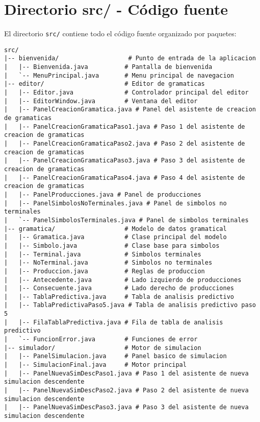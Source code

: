 \section{Directorio src/ - Código fuente}

El directorio \texttt{src/} contiene todo el código fuente organizado por paquetes:

\begin{lstlisting}[caption=Estructura del código fuente]
src/
|-- bienvenida/                   # Punto de entrada de la aplicacion
|   |-- Bienvenida.java          # Pantalla de bienvenida
|   `-- MenuPrincipal.java       # Menu principal de navegacion
|-- editor/                      # Editor de gramaticas
|   |-- Editor.java              # Controlador principal del editor
|   |-- EditorWindow.java        # Ventana del editor
|   |-- PanelCreacionGramatica.java # Panel del asistente de creacion de gramaticas
|   |-- PanelCreacionGramaticaPaso1.java # Paso 1 del asistente de creacion de gramaticas
|   |-- PanelCreacionGramaticaPaso2.java # Paso 2 del asistente de creacion de gramaticas
|   |-- PanelCreacionGramaticaPaso3.java # Paso 3 del asistente de creacion de gramaticas
|   |-- PanelCreacionGramaticaPaso4.java # Paso 4 del asistente de creacion de gramaticas
|   |-- PanelProducciones.java # Panel de producciones
|   |-- PanelSimbolosNoTerminales.java # Panel de simbolos no terminales
|   `-- PanelSimbolosTerminales.java # Panel de simbolos terminales
|-- gramatica/                   # Modelo de datos gramatical
|   |-- Gramatica.java           # Clase principal del modelo
|   |-- Simbolo.java             # Clase base para simbolos
|   |-- Terminal.java            # Simbolos terminales
|   |-- NoTerminal.java          # Simbolos no terminales
|   |-- Produccion.java          # Reglas de produccion
|   |-- Antecedente.java         # Lado izquierdo de producciones
|   |-- Consecuente.java         # Lado derecho de producciones
|   |-- TablaPredictiva.java     # Tabla de analisis predictivo
|   |-- TablaPredictivaPaso5.java # Tabla de analisis predictivo paso 5
|   |-- FilaTablaPredictiva.java # Fila de tabla de analisis predictivo
|   `-- FuncionError.java        # Funciones de error
|-- simulador/                   # Motor de simulacion
|   |-- PanelSimulacion.java     # Panel basico de simulacion
|   |-- SimulacionFinal.java     # Motor principal
|   |-- PanelNuevaSimDescPaso1.java # Paso 1 del asistente de nueva simulacion descendente
|   |-- PanelNuevaSimDescPaso2.java # Paso 2 del asistente de nueva simulacion descendente
|   |-- PanelNuevaSimDescPaso3.java # Paso 3 del asistente de nueva simulacion descendente

\end{lstlisting}
